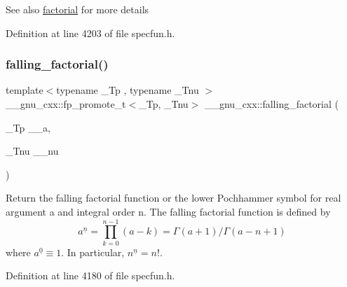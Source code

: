 \begin{DoxySeeAlso}{See also}
\hyperlink{group__mathsf__gnu_ga963b1612f50b0964f5f42c9f289aab68}{factorial} for more details 
\end{DoxySeeAlso}


Definition at line 4203 of file specfun.\+h.

\mbox{\label{group__mathsf__gnu_ga3cc8eb6068c7155ec48b40e20160c5c0}} 
\subsubsection{\texorpdfstring{falling\+\_\+factorial()}{falling\_factorial()}}
{\footnotesize\ttfamily template$<$typename \+\_\+\+Tp , typename \+\_\+\+Tnu $>$ \\
\+\_\+\+\_\+gnu\+\_\+cxx\+::fp\+\_\+promote\+\_\+t$<$\+\_\+\+Tp, \+\_\+\+Tnu$>$ \+\_\+\+\_\+gnu\+\_\+cxx\+::falling\+\_\+factorial (\begin{DoxyParamCaption}\item[{\+\_\+\+Tp}]{\+\_\+\+\_\+a,  }\item[{\+\_\+\+Tnu}]{\+\_\+\+\_\+nu }\end{DoxyParamCaption})\hspace{0.3cm}{\ttfamily [inline]}}



Return the falling factorial function or the lower Pochhammer symbol for real argument {\ttfamily a} and integral order {\ttfamily n}. The falling factorial function is defined by \[ a^{\underline{n}} = \prod_{k=0}^{n-1} (a - k) = \Gamma(a + 1) / \Gamma(a - n + 1) \] where $ a^{\underline{0}} \equiv 1 $. In particular, $ n^{\underline{n}} = n! $. 



Definition at line 4180 of file specfun.\+h.

\mbox{\label{group__mathsf__gnu_gaf32abbc790bfa870725728e5470de532}} 
